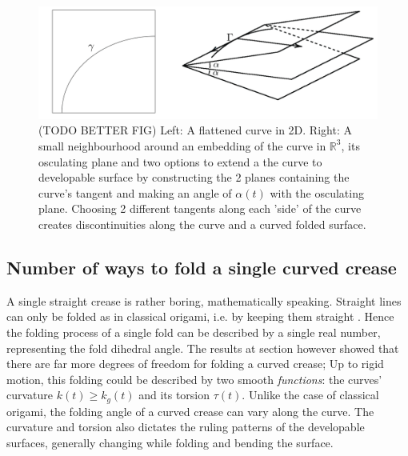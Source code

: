 \begin{figure} [h]
	\centering
	\includegraphics[width=0.7\linewidth]{figures/curved_fold_through_curve.pdf}
	\caption{(TODO BETTER FIG) Left: A flattened curve in 2D. Right: A small neighbourhood around an embedding of the curve in $\mathbb{R}^3$, its osculating plane and two options to extend a the curve to developable surface by constructing the 2 planes containing the curve's tangent and making an angle of $\alpha(t)$  with the osculating plane. Choosing 2 different tangents along each 'side' of the curve creates discontinuities along the curve and a curved folded surface.}
	\label{fig:curved_fold_through_curve}
\end{figure}

\subsection{Number of ways to fold a single curved crease}
A single straight crease is rather boring, mathematically speaking. Straight lines can only be folded as in classical origami, i.e. by keeping them straight \cite{demaine_lens}. Hence the folding process of a single fold can be described by a single real number, representing the fold dihedral angle. The results at section  however showed that there are far more degrees of freedom for folding a curved crease; Up to rigid motion, this folding could be described by two smooth \textit{functions}: the curves' curvature $k(t) \geq k_g(t)$ and its torsion $\tau(t)$. Unlike the case of classical origami, the folding angle of a curved crease can vary along the curve. The curvature and torsion also dictates the ruling patterns of the developable surfaces, generally changing while folding and bending the surface. %

